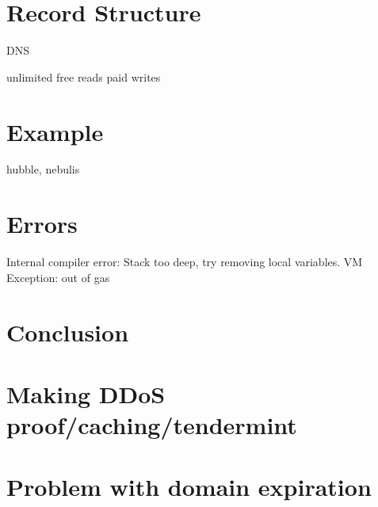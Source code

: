 \documentclass[conference]{IEEEtran}
\begin{document}
\section{Record Structure}
DNS 

unlimited free reads
paid writes

\section{Example}
hubble, nebulis


\section{Errors}
Internal compiler error: Stack too deep, try removing local variables.
VM Exception: out of gas

\section{Conclusion}
\section{Making DDoS proof/caching/tendermint}
\section{Problem with domain expiration}

\end{document}
